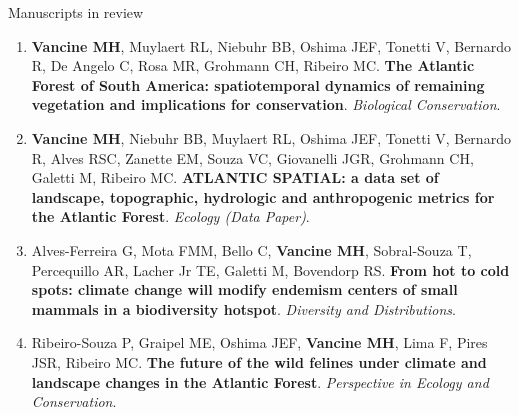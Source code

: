 \documentclass{resume}
\begin{document}
\begin{rSection}{Manuscripts in review}

\begin{enumerate} 

\item {\bf Vancine MH}, Muylaert RL, Niebuhr BB, Oshima JEF, Tonetti V, Bernardo R, De Angelo C, Rosa MR, Grohmann CH, Ribeiro MC. {\bf The Atlantic Forest of South America: spatiotemporal dynamics of remaining vegetation and implications for conservation}. {\it Biological Conservation}.

\item {\bf Vancine MH}, Niebuhr BB, Muylaert RL, Oshima JEF, Tonetti V, Bernardo R, Alves RSC, Zanette EM, Souza VC, Giovanelli JGR, Grohmann CH, Galetti M, Ribeiro MC. {\bf ATLANTIC  SPATIAL:  a  data  set  of  landscape,  topographic,  hydrologic  and  anthropogenic metrics for the Atlantic Forest}. {\it Ecology (Data Paper)}.

\item Alves-Ferreira G, Mota FMM, Bello C, {\bf Vancine MH}, Sobral-Souza T, Percequillo AR, Lacher Jr TE, Galetti M, Bovendorp RS. {\bf From hot to cold spots: climate change will modify endemism centers of small mammals in a biodiversity hotspot}. {\it Diversity and Distributions}.

\item Ribeiro-Souza P, Graipel ME, Oshima JEF, {\bf Vancine MH}, Lima F, Pires JSR, Ribeiro MC. {\bf The future of the wild felines under climate and landscape changes in the Atlantic Forest}. {\it Perspective in Ecology and Conservation}.

\end{enumerate} 

\end{rSection}

\end{document}
